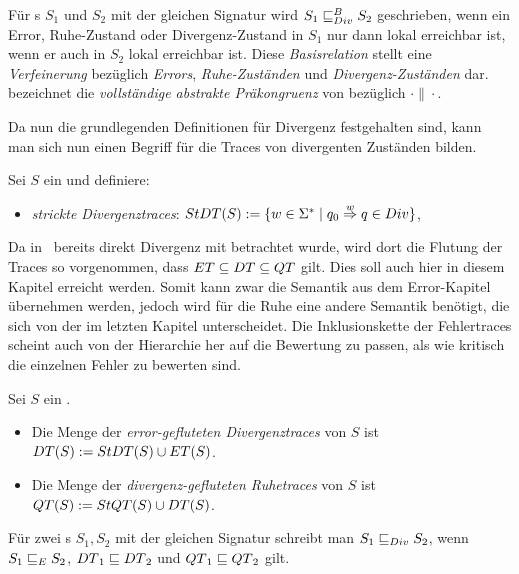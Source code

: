 \begin{Def}
Für \EIO{}s $S_1$ und $S_2$ mit der gleichen Signatur wird $S_1\sqsubseteq _{Div}^B S_2$
geschrieben, wenn ein Error, Ruhe-Zustand oder Divergenz-Zustand in $S_1$ nur
dann lokal erreichbar ist, wenn er auch in $S_2$ lokal erreichbar ist. Diese
\emph{Basisrelation} stellt eine \emph{Verfeinerung} bezüglich \emph{Errors},
\emph{Ruhe-Zuständen} und \emph{Divergenz-Zuständen} dar.\\
\DCRel{} bezeichnet die \emph{vollständige abstrakte Präkongruenz} von \DBRel{}
bezüglich $\cdot\|\cdot$.
\end{Def}

Da nun die grundlegenden Definitionen für Divergenz festgehalten sind,
kann man sich nun einen Begriff für die Traces von divergenten Zuständen
bilden.\\

\begin{Def}[Divergenztraces]
  Sei $S$ ein \EIO{} und definiere:
  \begin{itemize}
    \item \emph{strickte Divergenztraces}: $StDT{}(S) := \{w\in\Sigma ^*\mid
      q_0 \overset{w}{\Rightarrow} q\in Div\}$,
  \end{itemize}
\end{Def}

Da in~\cite{Chilton2013} bereits direkt Divergenz mit betrachtet wurde, wird
dort die Flutung der Traces so vorgenommen, dass $ET\subseteq DT\subseteq
QT$ gilt. Dies soll auch hier in diesem Kapitel erreicht werden. Somit kann
zwar die Semantik aus dem Error-Kapitel übernehmen werden, jedoch wird für die
Ruhe eine andere Semantik benötigt, die sich von der im letzten Kapitel
unterscheidet. Die Inklusionskette der Fehlertraces scheint auch von der
Hierarchie her auf die Bewertung zu passen, als wie kritisch die einzelnen
Fehler zu bewerten sind.

\begin{Def}
\label{DefRuheDivSemantik}
  Sei $S$ ein \EIO{}.
  \begin{itemize}
    \item Die Menge der \emph{error-gefluteten Divergenztraces} von $S$ ist
      $DT{}(S) := StDT{}(S)\cup ET{}(S)$.
    \item Die Menge der \emph{divergenz-gefluteten Ruhetraces} von $S$ ist
      $QT{}(S) := StQT{}(S)\cup DT{}(S)$.
  \end{itemize}
  Für zwei \EIO{}s $S_1, S_2$ mit der gleichen Signatur schreibt man $S_1\sqsubseteq _{Div}
  S_2$, wenn $S_1\sqsubseteq _E S_2$, $DT{}_1\sqsubseteq DT{}_2$ und
  $QT{}_1\sqsubseteq QT{}_2$ gilt.
\end{Def}

